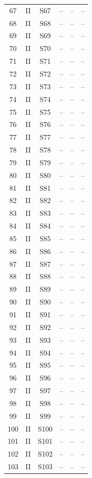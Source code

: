 \begin{longtable}{cccccc}
67 & II & S67 & -- & -- & --\\
68 & II & S68 & -- & -- & --\\
69 & II & S69 & -- & -- & --\\
70 & II & S70 & -- & -- & --\\
71 & II & S71 & -- & -- & --\\
72 & II & S72 & -- & -- & --\\
73 & II & S73 & -- & -- & --\\
74 & II & S74 & -- & -- & --\\
75 & II & S75 & -- & -- & --\\
76 & II & S76 & -- & -- & --\\
77 & II & S77 & -- & -- & --\\
78 & II & S78 & -- & -- & --\\
79 & II & S79 & -- & -- & --\\
80 & II & S80 & -- & -- & --\\
81 & II & S81 & -- & -- & --\\
82 & II & S82 & -- & -- & --\\
83 & II & S83 & -- & -- & --\\
84 & II & S84 & -- & -- & --\\
85 & II & S85 & -- & -- & --\\
86 & II & S86 & -- & -- & --\\
87 & II & S87 & -- & -- & --\\
88 & II & S88 & -- & -- & --\\
89 & II & S89 & -- & -- & --\\
90 & II & S90 & -- & -- & --\\
91 & II & S91 & -- & -- & --\\
92 & II & S92 & -- & -- & --\\
93 & II & S93 & -- & -- & --\\
94 & II & S94 & -- & -- & --\\
95 & II & S95 & -- & -- & --\\
96 & II & S96 & -- & -- & --\\
97 & II & S97 & -- & -- & --\\
98 & II & S98 & -- & -- & --\\
99 & II & S99 & -- & -- & --\\
100 & II & S100 & -- & -- & --\\
101 & II & S101 & -- & -- & --\\
102 & II & S102 & -- & -- & --\\
103 & II & S103 & -- & -- & --\\

\end{longtable}
